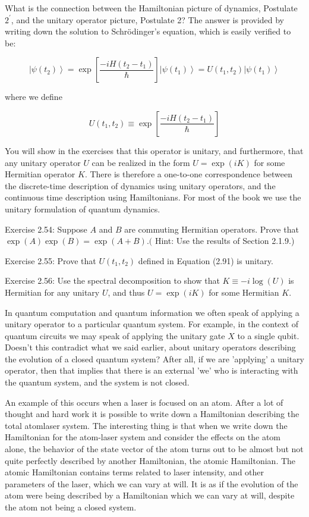 \documentclass[10pt]{article}
\begin{document}
What is the connection between the Hamiltonian picture of dynamics, Postulate $2^{\prime}$, and the unitary operator picture, Postulate 2? The answer is provided by writing down the solution to Schrödinger's equation, which is easily verified to be:


\begin{equation*}
\left|\psi\left(t_{2}\right)\right\rangle=\exp \left[\frac{-i H\left(t_{2}-t_{1}\right)}{\hbar}\right]\left|\psi\left(t_{1}\right)\right\rangle=U\left(t_{1}, t_{2}\right)\left|\psi\left(t_{1}\right)\right\rangle \tag{2.90}
\end{equation*}


where we define


\begin{equation*}
U\left(t_{1}, t_{2}\right) \equiv \exp \left[\frac{-i H\left(t_{2}-t_{1}\right)}{\hbar}\right] \tag{2.91}
\end{equation*}


You will show in the exercises that this operator is unitary, and furthermore, that any unitary operator $U$ can be realized in the form $U=\exp (i K)$ for some Hermitian operator $K$. There is therefore a one-to-one correspondence between the discrete-time description of dynamics using unitary operators, and the continuous time description using Hamiltonians. For most of the book we use the unitary formulation of quantum dynamics.

Exercise 2.54: Suppose $A$ and $B$ are commuting Hermitian operators. Prove that $\exp (A) \exp (B)=\exp (A+B) .($ Hint: Use the results of Section 2.1.9.)

Exercise 2.55: Prove that $U\left(t_{1}, t_{2}\right)$ defined in Equation (2.91) is unitary.

Exercise 2.56: Use the spectral decomposition to show that $K \equiv-i \log (U)$ is Hermitian for any unitary $U$, and thus $U=\exp (i K)$ for some Hermitian $K$.

In quantum computation and quantum information we often speak of applying a unitary operator to a particular quantum system. For example, in the context of quantum circuits we may speak of applying the unitary gate $X$ to a single qubit. Doesn't this contradict what we said earlier, about unitary operators describing the evolution of a closed quantum system? After all, if we are 'applying' a unitary operator, then that implies that there is an external 'we' who is interacting with the quantum system, and the system is not closed.

An example of this occurs when a laser is focused on an atom. After a lot of thought and hard work it is possible to write down a Hamiltonian describing the total atomlaser system. The interesting thing is that when we write down the Hamiltonian for the atom-laser system and consider the effects on the atom alone, the behavior of the state vector of the atom turns out to be almost but not quite perfectly described by another Hamiltonian, the atomic Hamiltonian. The atomic Hamiltonian contains terms related to laser intensity, and other parameters of the laser, which we can vary at will. It is as if the evolution of the atom were being described by a Hamiltonian which we can vary at will, despite the atom not being a closed system.
\end{document}

